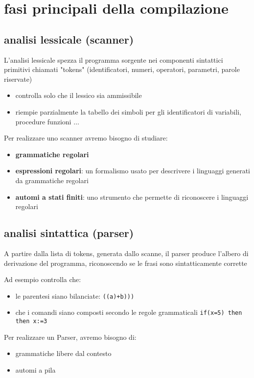 \section{fasi principali della compilazione}
\subsection{analisi lessicale (scanner)}
L'analisi lessicale spezza il programma sorgente nei componenti sintattici primitivi chiamati "tokens" (identificatori, numeri, operatori, parametri, parole riservate)
\begin{itemize}
    \item controlla solo che il lessico sia ammissibile 
    \item riempie parzialmente la tabello dei simboli per gli identificatori di variabili, procedure funzioni $\dots$
\end{itemize}

Per realizzare uno scanner avremo bisogno di studiare:
\begin{itemize}
    \item \textbf{grammatiche regolari}
    \item \textbf{espressioni regolari}: un formalismo usato per descrivere i linguaggi generati da grammatiche regolari 
    \item \textbf{automi a stati finiti}: uno strumento che permette di riconoscere i linguaggi regolari
\end{itemize}

\subsection{analisi sintattica (parser)}
A partire dalla lista di tokens, generata dallo scanne, il parser produce l'albero di derivazione del programma, riconoscendo se le frasi sono sintatticamente corrette

Ad esempio controlla che: 
\begin{itemize}
    \item le parentesi siano bilanciate: \texttt{((a)+b)))}
    \item che i comandi siano composti secondo le regole grammaticali \texttt{if(x=5) then then x:=3}
\end{itemize}

Per realizzare un Parser, avremo bisogno di:
\begin{itemize}
    \item grammatiche libere dal contesto
    \item automi a pila
\end{itemize}

